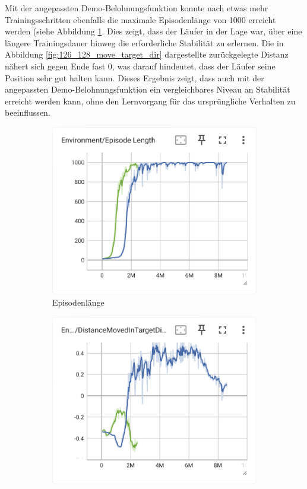 Mit der angepassten Demo-Belohnungsfunktion konnte nach etwas mehr Trainingsschritten ebenfalls die maximale Episodenlänge von 1000 erreicht werden (siehe Abbildung \ref{fig:126_128_episode_length}. Dies zeigt, dass der Läufer in der Lage war, über eine längere Trainingsdauer hinweg die erforderliche Stabilität zu erlernen. Die in Abbildung \ref{fig:126_128_move_target_dir} dargestellte zurückgelegte Distanz nähert sich gegen Ende fast 0, was darauf hindeutet, dass der Läufer seine Position sehr gut halten kann. Dieses Ergebnis zeigt, dass auch mit der angepassten Demo-Belohnungsfunktion ein vergleichbares Niveau an Stabilität erreicht werden kann, ohne den Lernvorgang für das ursprüngliche Verhalten zu beeinflussen.

\begin{figure}[H]
  \centering  
  \begin{subfigure}{.49\textwidth}
      \centering  
      \includegraphics[width=\textwidth]{img/126_128_episode_length}
      \caption{Episodenlänge}
      \label{fig:126_128_episode_length}
    \end{subfigure}
    \begin{subfigure}{.49\textwidth}
      \centering  
      \includegraphics[width=\textwidth]{img/126_128_move_target_dir}

\end{subfigure}
\end{figure}

